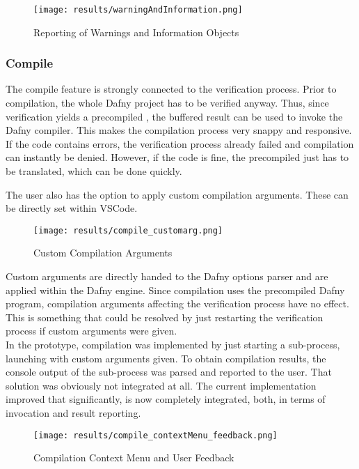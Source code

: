 \begin{figure}[H]
    \centering
    \texttt{[image: results/warningAndInformation.png]}
    \caption{Reporting of Warnings and Information Objects}
    \label{fig:result_warnd_info}
\end{figure}

\subsubsection{Compile}
The compile feature is strongly connected to the verification process.
Prior to compilation, the whole Dafny project has to be verified anyway.
Thus, since verification yields a precompiled , the buffered result can be used to invoke the Dafny compiler.
This makes the compilation process very snappy and responsive.\\

If the code contains errors, the verification process already failed and compilation can instantly be denied.
However, if the code is fine, the precompiled  just has to be translated, which can be done quickly.

The user also has the option to apply custom compilation arguments.
These can be directly set within VSCode.
\begin{figure}[H]
    \centering
    \texttt{[image: results/compile\_customarg.png]}
    \caption{Custom Compilation Arguments}
    \label{fig:compilation_custom_args}
\end{figure}

Custom arguments are directly handed to the Dafny options parser and are applied within the Dafny engine.
Since compilation uses the precompiled Dafny program, compilation arguments affecting the verification process have no effect.
This is something that could be resolved by just restarting the verification process if custom arguments were given.\\

In the prototype, compilation was implemented by just starting a sub-process, launching  with custom arguments given.
To obtain compilation results, the console output of the sub-process was parsed and reported to the user.
That solution was obviously not integrated at all.
The current implementation improved that significantly, is now completely integrated, both, in terms of invocation and result reporting.

\begin{figure}[H]
    \centering
    \texttt{[image: results/compile\_contextMenu\_feedback.png]}
    \caption{Compilation Context Menu and User Feedback}
    \label{fig:compilation_stuff}
\end{figure}



